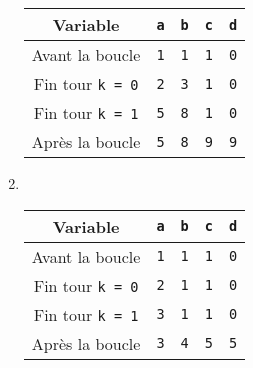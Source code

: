 \begin{correction}
\begin{enumerate}
\begin{center}
		\begin{tabular}{|c|c|c|c|c|}
			\hline
			Variable &\texttt{a}&\texttt{b}&\texttt{c}&\texttt{d} \\\hline
			Avant la boucle     &\texttt{1}&\texttt{1}&\texttt{1}&\texttt{0}\\\hline
			Fin tour \texttt{k = 0} &\texttt{2}&\texttt{3}&\texttt{1}&\texttt{0}\\\hline
			Fin tour \texttt{k = 1} &\texttt{5}&\texttt{8}&\texttt{1}&\texttt{0}\\\hline
			Après la boucle     &\texttt{5}&\texttt{8}&\texttt{9}&\texttt{9}\\\hline
		\end{tabular}\end{center}
		\item ~\begin{center}
		\begin{tabular}{|c|c|c|c|c|}
			\hline
			Variable &\texttt{a}&\texttt{b}&\texttt{c}&\texttt{d} \\\hline
			Avant la boucle     &\texttt{1}&\texttt{1}&\texttt{1}&\texttt{0}\\\hline
			Fin tour \texttt{k = 0} &\texttt{2}&\texttt{1}&\texttt{1}&\texttt{0}\\\hline
			Fin tour \texttt{k = 1} &\texttt{3}&\texttt{1}&\texttt{1}&\texttt{0}\\\hline
			Après la boucle     &\texttt{3}&\texttt{4}&\texttt{5}&\texttt{5}\\\hline
		\end{tabular}\end{center}
	\end{enumerate}
\end{correction}


